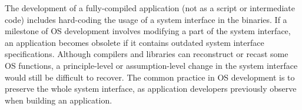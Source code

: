



The development of a fully-compiled application (not as a script or intermediate code)
includes hard-coding the usage of a system interface
in the binaries.
If a milestone of OS development involves modifying a part of the system interface,
an application becomes obsolete
if it contains outdated system interface specifications.
Although compilers and libraries can reconstruct or recast some OS functions,
a principle-level or assumption-level change in the system interface
would still be difficult to recover.
The common practice in OS development is to preserve
the whole system interface,
as application developers previously observe when building an application.




